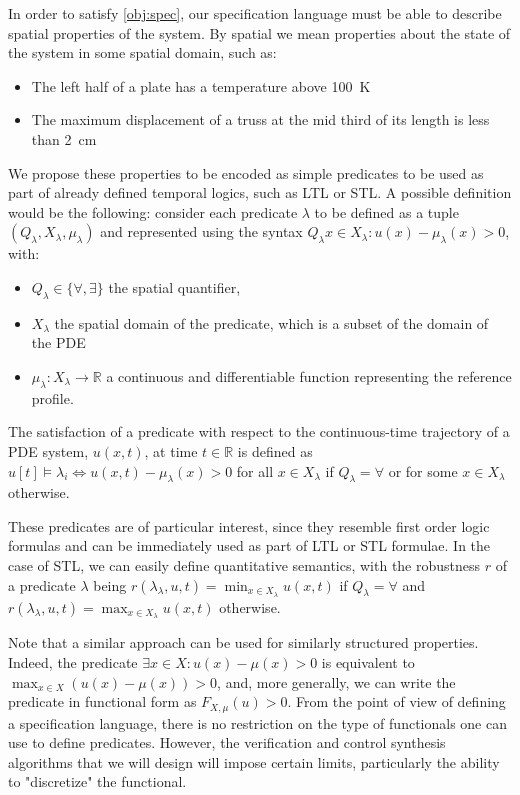 \documentclass{article}
\newcommand*{\R}{\mathbb{R}}
\begin{document}
In order to satisfy \cref{obj:spec}, our specification language must be able to
describe spatial properties of the system. By spatial we mean properties about
the state of the system in some spatial domain, such as:

\begin{itemize}
    \item The left half of a plate has a temperature above \SI{100}{\kelvin}
    \item The maximum displacement of a truss at the mid third of its
        length is less than \SI{2}{\cm}
\end{itemize}

We propose these properties to be encoded as simple predicates to be used as
part of already defined temporal logics, such as LTL or STL. A possible
definition would be the following: consider
each predicate $\lambda$ to be defined as a tuple $(Q_\lambda,
X_\lambda, \mu_\lambda)$ and represented using the syntax 
$Q_\lambda x \in X_\lambda : u(x) - \mu_\lambda(x) > 0$, with:

\begin{itemize}
    \item $Q_\lambda \in \{\forall, \exists\}$ the spatial quantifier,
    \item $X_\lambda$ the spatial domain of the predicate, which is a subset of
        the domain of the PDE
    \item $\mu_\lambda : X_\lambda \to \R$ a continuous and differentiable function 
        representing the reference profile.
\end{itemize}

The satisfaction of a
predicate with respect to the continuous-time trajectory of a PDE system,
$u(x,t)$, at time $t \in \R$ is defined as $u[t] \models \lambda_i \iff 
u(x, t) - \mu_\lambda(x) > 0$ for all $x \in X_\lambda$ if $Q_\lambda = \forall$ 
or for some $x \in X_\lambda$ otherwise.

These predicates are of particular interest, since they resemble first order
logic formulas and can be immediately used as part of LTL or STL formulae. In the
case of STL, we can easily define quantitative semantics, with the robustness $r$
of a predicate $\lambda$ being $r(\lambda_\lambda,u, t) = 
\min_{x \in X_\lambda} u(x, t)$ if $Q_\lambda = \forall$ and
$r(\lambda_\lambda,u, t) = \max_{x \in X_\lambda} u(x, t)$ otherwise.

Note that a similar approach can be used for similarly structured properties.
Indeed, the predicate $\exists x \in X: u(x) - \mu(x) > 0$ is equivalent to
$\max_{x \in X} (u(x) - \mu(x)) > 0$, and, more generally, we can write the 
predicate in functional form as $F_{X, \mu}(u) > 0$. From the point of view of
defining a specification language, there is no 
restriction on the type of functionals one can use to define predicates.
However, the verification and control synthesis algorithms that we will design
will impose certain limits, particularly the ability to "discretize" the
functional.
\end{document}
